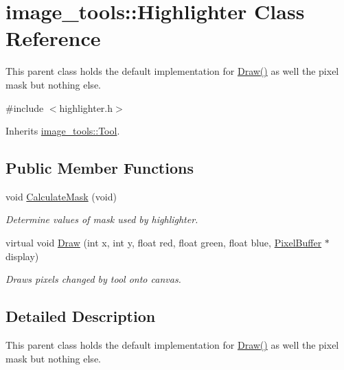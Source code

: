 \hypertarget{classimage__tools_1_1Highlighter}{}\section{image\+\_\+tools\+:\+:Highlighter Class Reference}
\label{classimage__tools_1_1Highlighter}


This parent class holds the default implementation for \hyperlink{classimage__tools_1_1Highlighter_a856c0fc1da4a5566b7945847eb92388d}{Draw()} as well the pixel mask but nothing else.  




{\ttfamily \#include $<$highlighter.\+h$>$}



Inherits \hyperlink{classimage__tools_1_1Tool}{image\+\_\+tools\+::\+Tool}.

\subsection*{Public Member Functions}
\begin{DoxyCompactItemize}
\item 
void \hyperlink{classimage__tools_1_1Highlighter_a2b3701d3c21f545d357c693e8f12f847}{Calculate\+Mask} (void)\hypertarget{classimage__tools_1_1Highlighter_a2b3701d3c21f545d357c693e8f12f847}{}\label{classimage__tools_1_1Highlighter_a2b3701d3c21f545d357c693e8f12f847}

\begin{DoxyCompactList}\small\item\em Determine values of mask used by highlighter. \end{DoxyCompactList}\item 
virtual void \hyperlink{classimage__tools_1_1Highlighter_a856c0fc1da4a5566b7945847eb92388d}{Draw} (int x, int y, float red, float green, float blue, \hyperlink{classimage__tools_1_1PixelBuffer}{Pixel\+Buffer} $\ast$display)\hypertarget{classimage__tools_1_1Highlighter_a856c0fc1da4a5566b7945847eb92388d}{}\label{classimage__tools_1_1Highlighter_a856c0fc1da4a5566b7945847eb92388d}

\begin{DoxyCompactList}\small\item\em Draws pixels changed by tool onto canvas. \end{DoxyCompactList}\end{DoxyCompactItemize}


\subsection{Detailed Description}
This parent class holds the default implementation for \hyperlink{classimage__tools_1_1Highlighter_a856c0fc1da4a5566b7945847eb92388d}{Draw()} as well the pixel mask but nothing else. 

